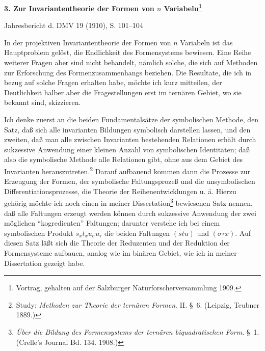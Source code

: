\documentclass[11pt]{article}
\begin{document}
\begin{center}
{\Large\bfseries 3. Zur Invariantentheorie der Formen von $n$ Variabeln\footnote{Vortrag, gehalten auf der Salzburger Naturforscherversammlung 1909.}}\par
\vspace{1.2em}
Jahresbericht d. DMV 19 (1910), S. 101--104
\end{center}

\vspace{1em}
In der projektiven Invariantentheorie der Formen von $n$ Variabeln ist das Hauptproblem gelöst, die Endlichkeit des Formensystems bewiesen. Eine Reihe weiterer Fragen aber sind nicht behandelt, nämlich solche, die sich auf Methoden zur Erforschung des Formenzusammenhangs beziehen. Die Resultate, die ich in bezug auf solche Fragen erhalten habe, möchte ich kurz mitteilen, der Deutlichkeit halber aber die Fragestellungen erst im ternären Gebiet, wo sie bekannt sind, skizzieren.

Ich denke zuerst an die beiden Fundamentalsätze der symbolischen Methode, den Satz, daß sich alle invarianten Bildungen symbolisch darstellen lassen, und den zweiten, daß man alle zwischen Invarianten bestehenden Relationen erhält durch sukzessive Anwendung einer kleinen Anzahl von symbolischen Identitäten; daß also die symbolische Methode alle Relationen gibt, ohne aus dem Gebiet des Invarianten herauszutreten.\footnote{Study: \emph{Methoden zur Theorie der ternären Formen}. II. \S\ 6. (Leipzig, Teubner 1889.)} Darauf aufbauend kommen dann die Prozesse zur Erzeugung der Formen, der symbolische Faltungsprozeß und die unsymbolischen Differentiationsprozesse, die Theorie der Reihenentwicklungen u. ä. Hierzu gehörig möchte ich noch einen in meiner Dissertation\footnote{\emph{Über die Bildung des Formensystems der ternären biquadratischen Form}. \S\ 1. (Crelle's Journal Bd. 134. 1908.)} bewiesenen Satz nennen, daß alle Faltungen erzeugt werden können durch sukzessive Anwendung der zwei möglichen ``kogredienten'' Faltungen; darunter verstehe ich bei einem symbolischen Produkt $s_x t_x u_\sigma u_\tau$ die beiden Faltungen $(stu)$ und $(\sigma\tau x)$. Auf diesen Satz läßt sich die Theorie der Reduzenten und der Reduktion der Formensysteme aufbauen, analog wie im binären Gebiet, wie ich in meiner Dissertation gezeigt habe.
\end{document}
